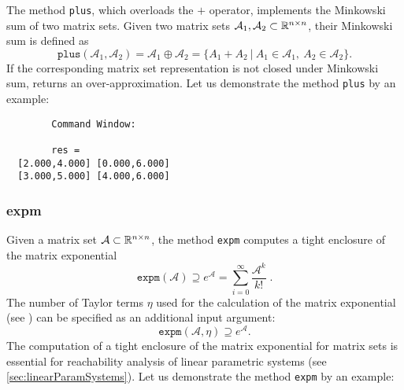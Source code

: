 The method \texttt{plus}, which overloads the $+$ operator, implements the Minkowski sum of two matrix sets. Given two matrix sets $\mathcal{A}_1,\mathcal{A}_2 \subset \mathbb{R}^{n \times n}$, their Minkowski sum is defined as 
\begin{equation*}
	\texttt{plus}(\mathcal{A}_1,\mathcal{A}_2) = \mathcal{A}_1 \oplus \mathcal{A}_2 = \{ A_1 + A_2 ~|~ A_1 \in \mathcal{A}_1,~ A_2 \in \mathcal{A}_2 \}.
\end{equation*}
If the corresponding matrix set representation is not closed under Minkowski sum,  returns an over-approximation. Let us demonstrate the method \texttt{plus} by an example:

\begin{center}
\begin{minipage}[t]{0.55\textwidth}
	\vspace{10pt}
	\footnotesize
	
\end{minipage}
\begin{minipage}[t]{0.43\textwidth}
	\vspace{10pt}
	\begin{verbatim}
		Command Window:	
	
		res = 
  [2.000,4.000] [0.000,6.000]
  [3.000,5.000] [4.000,6.000]
	\end{verbatim}
\end{minipage}
\end{center}

\newpage
\subsubsection{expm} \label{expmMatSet}

Given a matrix set $\mathcal{A} \subset \mathbb{R}^{n \times n}$, the method \texttt{expm} computes a tight enclosure of the matrix exponential
\begin{equation*}
	\texttt{expm}(\mathcal{A}) \supseteq e^{\mathcal{A}} = \sum_{i=0}^\infty \frac{\mathcal{A}^k}{k!} \; .
\end{equation*}
The number of Taylor terms $\eta$ used for the calculation of the matrix exponential (see \cite[Theorem~3.2]{Althoff2010a}) can be specified as an additional input argument:
\begin{equation*}
	\texttt{expm}(\mathcal{A},\eta) \supseteq e^{\mathcal{A}}.
\end{equation*}
The computation of a tight enclosure of the matrix exponential for matrix sets is essential for reachability analysis of linear parametric systems (see \cref{sec:linearParamSystems}). Let us demonstrate the method \texttt{expm} by an example:


